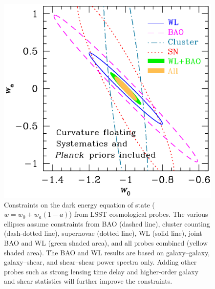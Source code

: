 \begin{figure}
\includegraphics[width=1.0\hsize,clip]{cswb.pdf}
\caption{
Constraints on the dark energy equation of state ($w = w_0 +
w_a(1-a)$) from LSST cosmological probes.  The various ellipses assume
constraints from BAO (dashed line), cluster counting (dash-dotted line),
supernovae (dotted line), WL (solid line), joint BAO and WL
(green shaded area), and all probes combined (yellow shaded area).
The BAO and WL results are based on galaxy--galaxy, galaxy--shear,
and shear--shear power spectra only.
Adding other probes such as strong lensing time delay
and higher-order galaxy and shear statistics will further improve
the constraints.}
\label{Fig:DEellipses}
\end{figure}





